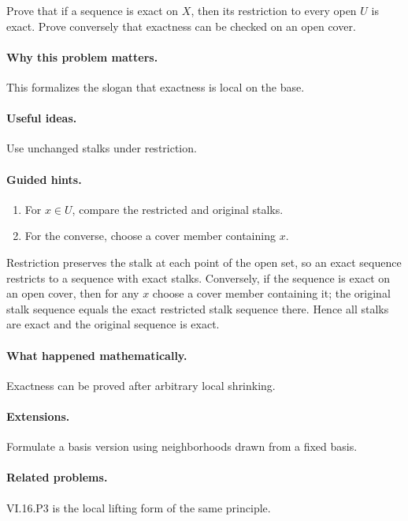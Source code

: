 \begin{problem}\label{prob:vi16-p09}
Prove that if a sequence is exact on $X$, then its restriction to every open $U$ is exact.  Prove conversely that exactness can be checked on an open cover.
\end{problem}

\ifdefined\FullProblemDossiers
\paragraph{Why this problem matters.}
This formalizes the slogan that exactness is local on the base.

\paragraph{Useful ideas.}
Use unchanged stalks under restriction.

\paragraph{Guided hints.}
\begin{enumerate}
\item For $x\in U$, compare the restricted and original stalks.
\item For the converse, choose a cover member containing $x$.
\end{enumerate}

\begin{solution}
Restriction preserves the stalk at each point of the open set, so an exact sequence restricts to a sequence with exact stalks.  Conversely, if the sequence is exact on an open cover, then for any $x$ choose a cover member containing it; the original stalk sequence equals the exact restricted stalk sequence there.  Hence all stalks are exact and the original sequence is exact.
\end{solution}

\paragraph{What happened mathematically.}
Exactness can be proved after arbitrary local shrinking.

\paragraph{Extensions.}
Formulate a basis version using neighborhoods drawn from a fixed basis.

\paragraph{Related problems.}
VI.16.P3 is the local lifting form of the same principle.
\fi
